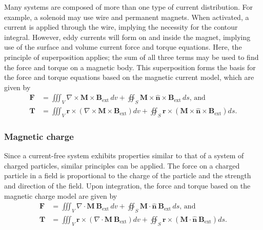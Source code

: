 Many systems are composed of more than one type of current distribution. For example, a solenoid may use wire and permanent magnets. When activated, a current is applied through the wire, implying the necessity for the contour integral. However, eddy currents will form on and inside the magnet, implying use of the surface and volume current force and torque equations. Here, the principle of superposition applies; the sum of all three terms may be used to find the force and torque on a magnetic body. This superposition forms the basis for the force and torque equations based on the magnetic current model, which are given by
\begin{align}
    \mathbf{F} &= \iiint_V \nabla \times \mathbf{M} \times \mathbf{B}_\text{ext}\, dv + \oiint_S \mathbf{M} \times \hat{\mathbf{n}} \times \mathbf{B}_\text{ext}\, ds \text{, and} \\
    \mathbf{T} &= \iiint_V \mathbf{r} \times \left( \nabla \times \mathbf{M} \times \mathbf{B}_\text{ext} \right) dv + \oiint_S \mathbf{r} \times \left( \mathbf{M} \times \hat{\mathbf{n}} \times \mathbf{B}_\text{ext} \right) ds \text{.}
\end{align}

\subsubsection{Magnetic charge}
Since a current-free system exhibits properties similar to that of a system of charged particles, similar principles can be applied. The force on a charged particle in a field is proportional to the charge of the particle and the strength and direction of the field. Upon integration, the force and torque based on the magnetic charge model are given by
\begin{align}
    \mathbf{F} &= \iiint_V \nabla \cdot \mathbf{M} \ \mathbf{B}_\text{ext}\, dv + \oiint_S \mathbf{M} \cdot \hat{\mathbf{n}} \ \mathbf{B}_\text{ext}\, ds \text{, and} \\
    \mathbf{T} &= \iiint_V \mathbf{r} \times \left( \nabla \cdot \mathbf{M} \ \mathbf{B}_\text{ext} \right) dv + \oiint_S \mathbf{r} \times \left( \mathbf{M} \cdot \hat{\mathbf{n}} \ \mathbf{B}_\text{ext} \right) ds \text{.}
\end{align}

